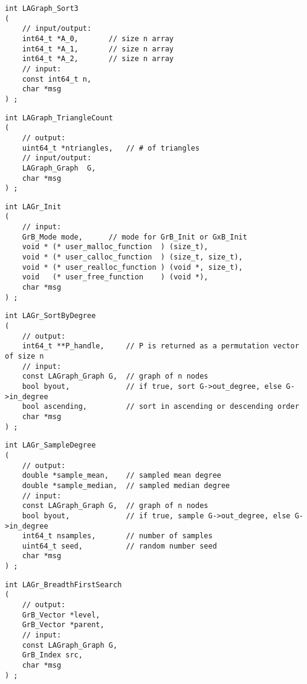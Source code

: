 \begin{verbatim}
int LAGraph_Sort3
(
    // input/output:
    int64_t *A_0,       // size n array
    int64_t *A_1,       // size n array
    int64_t *A_2,       // size n array
    // input:
    const int64_t n,
    char *msg
) ;
\end{verbatim}




\begin{verbatim}
int LAGraph_TriangleCount
(
    // output:
    uint64_t *ntriangles,   // # of triangles
    // input/output:
    LAGraph_Graph  G,
    char *msg
) ;
\end{verbatim}




\begin{verbatim}
int LAGr_Init
(
    // input:
    GrB_Mode mode,      // mode for GrB_Init or GxB_Init
    void * (* user_malloc_function  ) (size_t),
    void * (* user_calloc_function  ) (size_t, size_t),
    void * (* user_realloc_function ) (void *, size_t),
    void   (* user_free_function    ) (void *),
    char *msg
) ;
\end{verbatim}




\begin{verbatim}
int LAGr_SortByDegree
(
    // output:
    int64_t **P_handle,     // P is returned as a permutation vector of size n
    // input:
    const LAGraph_Graph G,  // graph of n nodes
    bool byout,             // if true, sort G->out_degree, else G->in_degree
    bool ascending,         // sort in ascending or descending order
    char *msg
) ;
\end{verbatim}




\begin{verbatim}
int LAGr_SampleDegree
(
    // output:
    double *sample_mean,    // sampled mean degree
    double *sample_median,  // sampled median degree
    // input:
    const LAGraph_Graph G,  // graph of n nodes
    bool byout,             // if true, sample G->out_degree, else G->in_degree
    int64_t nsamples,       // number of samples
    uint64_t seed,          // random number seed
    char *msg
) ;
\end{verbatim}




\begin{verbatim}
int LAGr_BreadthFirstSearch
(
    // output:
    GrB_Vector *level,
    GrB_Vector *parent,
    // input:
    const LAGraph_Graph G,
    GrB_Index src,
    char *msg
) ;
\end{verbatim}




